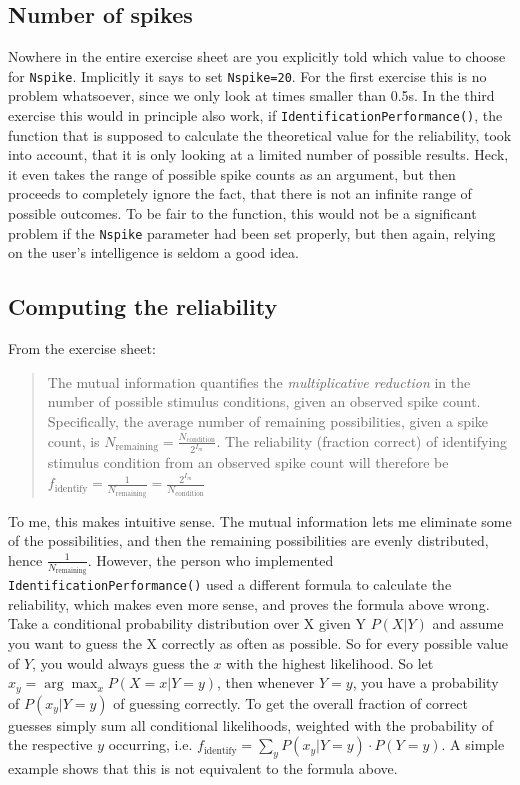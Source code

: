 \documentclass{scrartcl}
\begin{document}
\subsection*{Number of spikes}
Nowhere in the entire exercise sheet are you explicitly told which value to choose for \texttt{Nspike}. Implicitly it says to set \texttt{Nspike=20}. For the first exercise this is no problem whatsoever, since we only look at times smaller than 0.5\si{s}. In the third exercise this would in principle also work, if \texttt{IdentificationPerformance()}, the function that is supposed to calculate the theoretical value for the reliability, took into account, that it is only looking at a limited number of possible results. Heck, it even takes the range of possible spike counts as an argument, but then proceeds to completely ignore the fact, that there is not an infinite range of possible outcomes. To be fair to the function, this would not be a significant problem if the \texttt{Nspike} parameter had been set properly, but then again, relying on the user's intelligence is seldom a good idea.

\subsection*{Computing the reliability}
From the exercise sheet:
\begin{quote}
The mutual information quantifies the \textit{multiplicative reduction} in the number of possible stimulus conditions, given an observed spike count. Specifically, the average number of remaining possibilities, given a spike count, is $N_\mathrm{remaining} = \frac{N_\mathrm{condition}}{2^{I_m}}$. The reliability (fraction correct) of identifying stimulus condition from an observed spike count will therefore be $f_\mathrm{identify} = \frac{1}{N_\mathrm{remaining}} = \frac{2^{I_m}}{N_\mathrm{condition}}$
\end{quote}
To me, this makes intuitive sense. The mutual information lets me eliminate some of the possibilities, and then the remaining possibilities are evenly distributed, hence $\frac{1}{N_\mathrm{remaining}}$. However, the person who implemented \texttt{IdentificationPerformance()} used a different formula to calculate the reliability, which makes even more sense, and proves the formula above wrong. Take a conditional probability distribution over X given Y $P(X|Y)$ and assume you want to guess the X correctly as often as possible. So for every possible value of $Y$, you would always guess the $x$ with the highest likelihood. So let $x_y=\arg\max_x P(X=x|Y=y)$, then whenever $Y=y$, you have a probability of $P(x_y|Y=y)$ of guessing correctly. To get the overall fraction of correct guesses simply sum all conditional likelihoods, weighted with the probability of the respective $y$ occurring, i.e. $f_\mathrm{identify}=\sum_y P(x_y|Y=y) \cdot P(Y=y)$. A simple example shows that this is not equivalent to the formula above.
\end{document}
